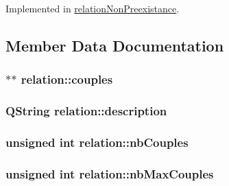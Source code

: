 Implemented in \hyperlink{classrelationNonPreexistance_ae3d01f6d8c081235d54f6494b7de81c5}{relation\+Non\+Preexistance}.



\subsection{Member Data Documentation}
\subsubsection[{\texorpdfstring{couples}{couples}}]{$\ast$$\ast$ relation\+::couples\hspace{0.3cm}{\ttfamily [protected]}}\hypertarget{classrelation_a0538de8d6ba28bcf00648cba15d404bb}{}\label{classrelation_a0538de8d6ba28bcf00648cba15d404bb}
\subsubsection[{\texorpdfstring{description}{description}}]{\setlength{\rightskip}{0pt plus 5cm}Q\+String relation\+::description\hspace{0.3cm}{\ttfamily [protected]}}\hypertarget{classrelation_ad4596e53bef9877bb2047c64a31b51de}{}\label{classrelation_ad4596e53bef9877bb2047c64a31b51de}
\subsubsection[{\texorpdfstring{nb\+Couples}{nbCouples}}]{\setlength{\rightskip}{0pt plus 5cm}unsigned int relation\+::nb\+Couples\hspace{0.3cm}{\ttfamily [protected]}}\hypertarget{classrelation_aab4b3cf31947f889052c30a23c1b8b59}{}\label{classrelation_aab4b3cf31947f889052c30a23c1b8b59}
\subsubsection[{\texorpdfstring{nb\+Max\+Couples}{nbMaxCouples}}]{\setlength{\rightskip}{0pt plus 5cm}unsigned int relation\+::nb\+Max\+Couples\hspace{0.3cm}{\ttfamily [protected]}}\hypertarget{classrelation_a8eb4534c23819a78d142841ddf28dd6e}{}\label{classrelation_a8eb4534c23819a78d142841ddf28dd6e}
